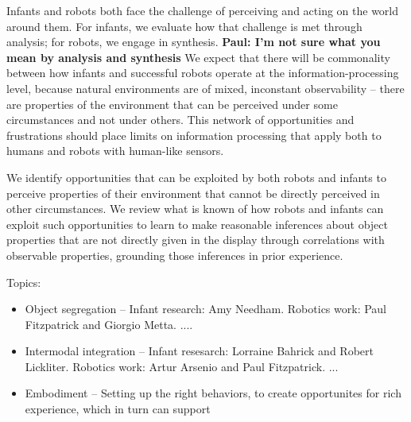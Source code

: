 
Infants and robots both face the challenge of perceiving and acting on
the world around them.  For infants, we evaluate how that challenge is
met through analysis; for robots, we engage in synthesis.  
%
{\bf Paul:  I'm not sure what you mean by analysis and synthesis}
%
We expect
that there will be commonality between how infants and successful
robots operate at the information-processing level, because natural
environments are of mixed, inconstant observability -- there are
properties of the environment that can be perceived under some
circumstances and not under others.  This network of opportunities and
frustrations should place limits on information processing that apply
both to humans and robots with human-like sensors.

We identify opportunities that can be exploited by both robots and
infants to perceive properties of their environment that cannot be
directly perceived in other circumstances.  We review what is known of
how robots and infants can exploit such opportunities to learn to make
reasonable inferences 
%
%
about object properties that are not directly given in the display
%
through correlations
with observable properties, grounding those inferences in prior
experience.

Topics:

\begin{itemize}

\item Object segregation --
  Infant research: Amy Needham.
  Robotics work: Paul Fitzpatrick and Giorgio Metta. ....

\item Intermodal integration --
  Infant resesarch: Lorraine Bahrick and Robert Lickliter.
  Robotics work: Artur Arsenio and Paul Fitzpatrick. ...

\item Embodiment -- 
  Setting up the right behaviors, to create opportunites
  for rich experience, which in turn can support 



\end{itemize}

